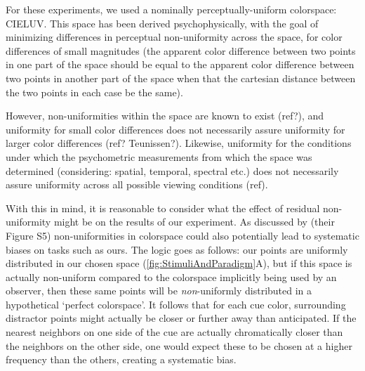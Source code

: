 For these experiments, we used a nominally perceptually-uniform colorspace: CIELUV. 
This space has been derived psychophysically, with the goal of minimizing differences in perceptual non-uniformity across the space, for color differences of small magnitudes (the apparent color difference between two points in one part of the space should be equal to the apparent color difference between two points in another part of the space when that the cartesian distance between the two points in each case be the same).

However, non-uniformities within the space are known to exist (ref?), and uniformity for small color differences does not necessarily assure uniformity for larger color differences (ref? Teunissen?). %
Likewise, uniformity for the conditions under which the psychometric measurements from which the space was determined (considering: spatial, temporal, spectral etc.) does not necessarily assure uniformity across all possible viewing conditions (ref).

With this in mind, it is reasonable to consider what the effect of residual non-uniformity might be on the results of our experiment. 
As discussed by \cite{panichello_error-correcting_2019} (their Figure S5) non-uniformities in colorspace could also potentially lead to systematic biases on tasks such as ours. %
The logic goes as follows: our points are uniformly distributed in our chosen space (\autoref{fig:StimuliAndParadigm}A), but if this space is actually non-uniform compared to the colorspace implicitly being used by an observer, then these same points will be \emph{non}-uniformly distributed in a hypothetical `perfect colorspace'. 
It follows that for each cue color, surrounding distractor points might actually be closer or further away than anticipated. 
If the nearest neighbors on one side of the cue are actually chromatically closer than the neighbors on the other side, one would expect these to be chosen at a higher frequency than the others, creating a systematic bias.


